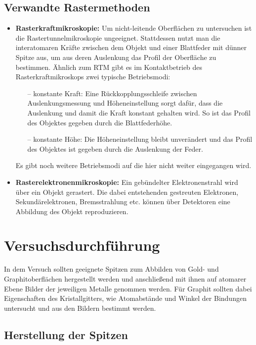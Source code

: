 \documentclass[10pt, a4paper]{article}
\begin{document}
\subsection{Verwandte Rastermethoden}
\begin{itemize}
  \item \textbf{Rasterkraftmikroskopie:} Um nicht-leitende Oberflächen zu untersuchen ist die Rastertunnelmikroskopie ungeeignet.
  Stattdessen nutzt man die interatomaren Kräfte zwischen dem Objekt und einer Blattfeder mit dünner Spitze aus, um aus deren Auslenkung das Profil der Oberfläche zu bestimmen.
  Ähnlich zum RTM gibt es im Kontaktbetrieb des Rasterkraftmikroskops zwei typische Betriebsmodi:
  \begin{itemize}
  \item[--] konstante Kraft: Eine Rückkopplungsschleife zwischen Auslenkungsmessung und Höheneinstellung sorgt dafür, dass die Auslenkung und damit die Kraft konstant gehalten wird.
  So ist das Profil des Objektes gegeben durch die Blattfederhöhe.
  \item[--] konstante Höhe: Die Höheneinstellung bleibt unverändert und das Profil des Objektes ist gegeben durch die Auslenkung der Feder.
  \end{itemize}
  Es gibt noch weitere Betriebsmodi auf die hier nicht weiter eingegangen wird.
  \item \textbf{Rasterelektronenmikroskopie:} Ein gebündelter Elektronenstrahl wird über ein Objekt gerastert.
  Die dabei entstehenden gestreuten Elektronen, Sekundärelektronen, Bremsstrahlung etc. können über Detektoren eine Abbildung des Objekt reproduzieren.
\end{itemize}

\section{Versuchsdurchführung}

In dem Versuch sollten geeignete Spitzen zum Abbilden von Gold- und Graphitoberflächen hergestellt werden und anschließend mit ihnen auf atomarer Ebene Bilder der jeweiligen Metalle genommen werden.
Für Graphit sollten dabei Eigenschaften des Kristallgitters, wie Atomabstände und Winkel der Bindungen untersucht und aus den Bildern bestimmt werden. 

\subsection{Herstellung der Spitzen}
\end{document}
